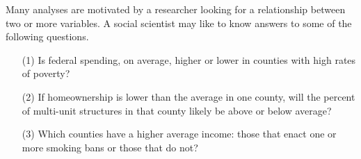 
Many analyses are motivated by a researcher looking for a relationship between two or more variables. A social scientist may like to know answers to some of the following questions.
\begin{enumerate}
\setlength{\itemsep}{0mm}
\item[(1)]\label{fedSpendingPovertyQuestion} Is federal spending, on average, higher or lower in counties with high rates of poverty?
\item[(2)]\label{ownershipMultiUnitQuestion} If homeownership is lower than the average in one county, will the percent of multi-unit structures in that county likely be above or below average?
\item[(3)]\label{isAverageIncomeAssociatedWithSmokingBans} Which counties have a higher average income: those that enact one or more smoking bans or those that do not?
\end{enumerate}

